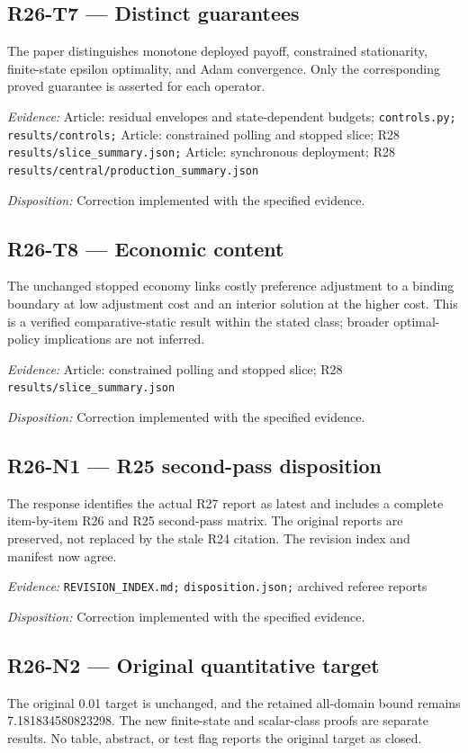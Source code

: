 \subsection{R26-T7 --- Distinct guarantees}
The paper distinguishes monotone deployed payoff, constrained stationarity, finite-state epsilon optimality, and Adam convergence. Only the corresponding proved guarantee is asserted for each operator.

\emph{Evidence:} Article: residual envelopes and state-dependent budgets; \nolinkurl{controls.py;} \nolinkurl{results/controls;} Article: constrained polling and stopped slice; R28 \nolinkurl{results/slice_summary.json;} Article: synchronous deployment; R28 \nolinkurl{results/central/production_summary.json}

\emph{Disposition:} Correction implemented with the specified evidence.
\subsection{R26-T8 --- Economic content}
The unchanged stopped economy links costly preference adjustment to a binding boundary at low adjustment cost and an interior solution at the higher cost. This is a verified comparative-static result within the stated class; broader optimal-policy implications are not inferred.

\emph{Evidence:} Article: constrained polling and stopped slice; R28 \nolinkurl{results/slice_summary.json}

\emph{Disposition:} Correction implemented with the specified evidence.
\subsection{R26-N1 --- R25 second-pass disposition}
The response identifies the actual R27 report as latest and includes a complete item-by-item R26 and R25 second-pass matrix. The original reports are preserved, not replaced by the stale R24 citation. The revision index and manifest now agree.

\emph{Evidence:} \nolinkurl{REVISION_INDEX.md;} \nolinkurl{disposition.json;} archived referee reports

\emph{Disposition:} Correction implemented with the specified evidence.
\subsection{R26-N2 --- Original quantitative target}
The original 0.01 target is unchanged, and the retained all-domain bound remains 7.181834580823298. The new finite-state and scalar-class proofs are separate results. No table, abstract, or test flag reports the original target as closed.

